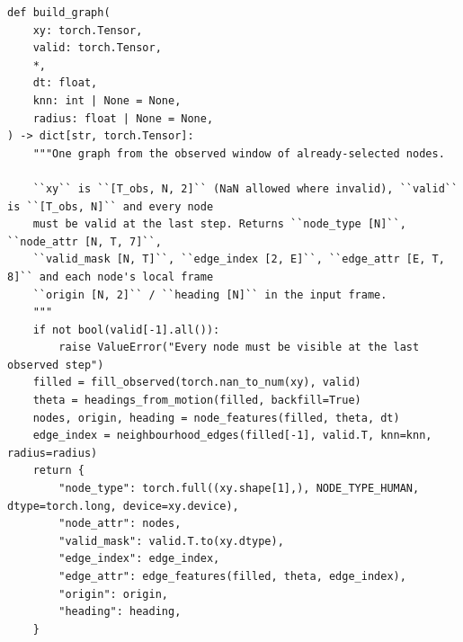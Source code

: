 \documentclass[10pt]{article}
\begin{document}
\par\smallskip{}\par\nopagebreak
\begin{lstlisting}[aboveskip=2pt]
def build_graph(
    xy: torch.Tensor,
    valid: torch.Tensor,
    *,
    dt: float,
    knn: int | None = None,
    radius: float | None = None,
) -> dict[str, torch.Tensor]:
    """One graph from the observed window of already-selected nodes.

    ``xy`` is ``[T_obs, N, 2]`` (NaN allowed where invalid), ``valid`` is ``[T_obs, N]`` and every node
    must be valid at the last step. Returns ``node_type [N]``, ``node_attr [N, T, 7]``,
    ``valid_mask [N, T]``, ``edge_index [2, E]``, ``edge_attr [E, T, 8]`` and each node's local frame
    ``origin [N, 2]`` / ``heading [N]`` in the input frame.
    """
    if not bool(valid[-1].all()):
        raise ValueError("Every node must be visible at the last observed step")
    filled = fill_observed(torch.nan_to_num(xy), valid)
    theta = headings_from_motion(filled, backfill=True)
    nodes, origin, heading = node_features(filled, theta, dt)
    edge_index = neighbourhood_edges(filled[-1], valid.T, knn=knn, radius=radius)
    return {
        "node_type": torch.full((xy.shape[1],), NODE_TYPE_HUMAN, dtype=torch.long, device=xy.device),
        "node_attr": nodes,
        "valid_mask": valid.T.to(xy.dtype),
        "edge_index": edge_index,
        "edge_attr": edge_features(filled, theta, edge_index),
        "origin": origin,
        "heading": heading,
    }

\end{lstlisting}
\end{document}
